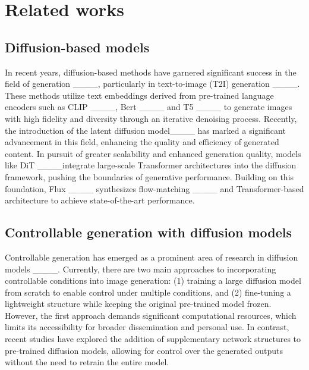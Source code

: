 \section{Related works}
\subsection{Diffusion-based models}
In recent years, diffusion-based methods have garnered significant success in the field of generation ____, particularly in text-to-image (T2I) generation ____. These methods utilize text embeddings derived from pre-trained language encoders such as CLIP ____, Bert ____ and T5 ____ to generate images with high fidelity and diversity through an iterative denoising process. Recently, the introduction of the latent diffusion model____ has marked a significant advancement in this field, enhancing the quality and efficiency of generated content. In pursuit of greater scalability and enhanced generation quality, models like DiT ____integrate large-scale Transformer architectures into the diffusion framework, pushing the boundaries of generative performance. Building on this foundation, Flux ____ synthesizes flow-matching ____ and Transformer-based architecture to achieve state-of-the-art performance.

\subsection{Controllable generation with diffusion models}
Controllable generation has emerged as a prominent area of research in diffusion models ____. Currently, there are two main approaches to incorporating controllable conditions into image generation: (1) training a large diffusion model from scratch to enable control under multiple conditions, and (2) fine-tuning a lightweight structure while keeping the original pre-trained model frozen. However, the first approach demands significant computational resources, which limits its accessibility for broader dissemination and personal use. In contrast, recent studies have explored the addition of supplementary network structures to pre-trained diffusion models, allowing for control over the generated outputs without the need to retrain the entire model.


